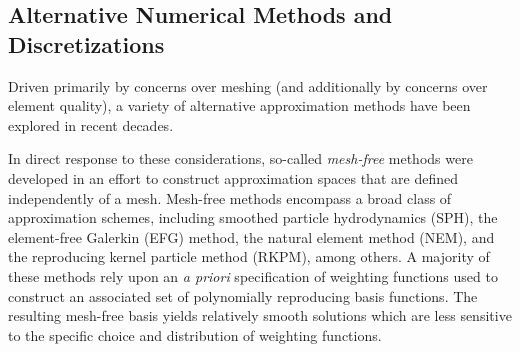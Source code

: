 		
	
	\subsection*{Alternative Numerical Methods and Discretizations}
		Driven primarily by concerns over meshing (and additionally by concerns over element quality), a variety of alternative approximation methods have been explored in recent decades. %
		
		
		In direct response to these considerations, so-called \textit{mesh-free} methods were developed in an effort to construct approximation spaces that are defined independently of a mesh. Mesh-free methods encompass a broad class of approximation schemes, including smoothed particle hydrodynamics (SPH), the element-free Galerkin (EFG) method, the natural element method (NEM), and the reproducing kernel particle method (RKPM), among others. A majority of these methods rely upon an \textit{a priori} specification of weighting functions used to construct an associated set of polynomially reproducing basis functions. The resulting mesh-free basis yields relatively smooth solutions which are less sensitive to the specific choice and distribution of weighting functions.
		
